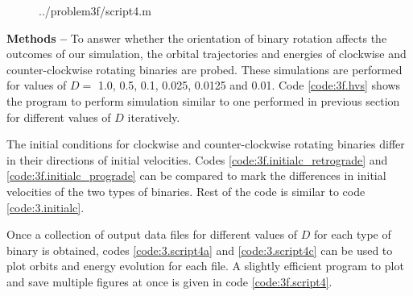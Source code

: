 \documentclass[a4paper]{article}
\begin{document}
\begin{enumerate} [label*=\textbf{(\alph*)}]
				\begin{figure} [h]
					 {../problem3f/script4.m}
				\end{figure}
				
				\subitem \textbf{Methods --}
				To answer whether the orientation of binary rotation affects the outcomes of our simulation, the orbital trajectories and energies of clockwise and counter-clockwise rotating binaries are probed. These simulations are performed for values of \(D =\) 1.0, 0.5, 0.1, 0.025, 0.0125 and 0.01. Code \ref{code:3f.hvs} shows the program to perform simulation similar to one performed in previous section for different values of \(D\) iteratively.
				
				The initial conditions for clockwise and counter-clockwise rotating binaries differ in their directions of initial velocities. Codes \ref{code:3f.initialc_retrograde} and \ref{code:3f.initialc_prograde} can be compared to mark the differences in initial velocities of the two types of binaries. Rest of the code is similar to code \ref{code:3.initialc}.
				
				Once a collection of output data files for different values of \(D\) for each type of binary is obtained, codes \ref{code:3.script4a} and \ref{code:3.script4c} can be used to plot orbits and energy evolution for each file. A slightly efficient program to plot and save multiple figures at once is given in code \ref{code:3f.script4}.
				

\end{enumerate}
\end{document}
